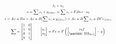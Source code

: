 \vspace{-0.5cm}


\begin{equation}
\centering
\resizebox{0.44\textwidth}{!}{$
    \begin{gathered}
        \dot{x}_i = u_1 \\
        u = \sum x_i + y_{filter} = \sum x_i + Filter \cdot u_2 \\
        \dot{x} = Ax + Bu = Ax + B(\sum x_i + y_{filter}) = Ax + B\sum x_i + B C x_{filter} \\
        \sum =
        \begin{bmatrix}
            1 & 0 \\ 1 & 0 \\ 0 & 1 \\ 0 & 1   
        \end{bmatrix} \quad \quad
        \begin{bmatrix}
            u_1 \\ u_2   
        \end{bmatrix}
        = F e = F \left(\begin{bmatrix}ref \\ \mathbb{0}_{8\times 1} \end{bmatrix}-y\right)  
    \end{gathered}$}
    \label{AugEq1}
\end{equation}
